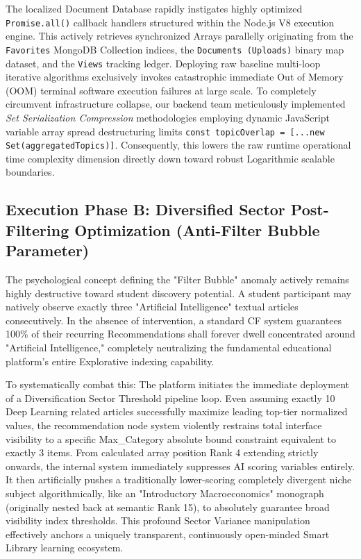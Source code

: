 \documentclass[journal]{IEEEtran}
\begin{document}
The localized Document Database rapidly instigates highly optimized \texttt{Promise.all()} callback handlers structured within the Node.js V8 execution engine. 
This actively retrieves synchronized Arrays parallelly originating from the \texttt{Favorites} MongoDB Collection indices, the \texttt{Documents (Uploads)} binary map dataset, and the \texttt{Views} tracking ledger. 
Deploying raw baseline multi-loop iterative algorithms exclusively invokes catastrophic immediate Out of Memory (OOM) terminal software execution failures at large scale. 
To completely circumvent infrastructure collapse, our backend team meticulously implemented \textit{Set Serialization Compression} methodologies employing dynamic JavaScript variable array spread destructuring limits \texttt{const topicOverlap = [...new Set(aggregatedTopics)]}. 
Consequently, this lowers the raw runtime operational time complexity dimension directly down toward robust Logarithmic scalable boundaries.

\subsection{Execution Phase B: Diversified Sector Post-Filtering Optimization (Anti-Filter Bubble Parameter)}

The psychological concept defining the "Filter Bubble" anomaly actively remains highly destructive toward student discovery potential. 
A student participant may natively observe exactly three "Artificial Intelligence" textual articles consecutively. 
In the absence of intervention, a standard CF system guarantees 100\% of their recurring Recommendations shall forever dwell concentrated around "Artificial Intelligence," completely neutralizing the fundamental educational platform's entire Explorative indexing capability.

To systematically combat this: 
The platform initiates the immediate deployment of a Diversification Sector Threshold pipeline loop. 
Even assuming exactly 10 Deep Learning related articles successfully maximize leading top-tier normalized values, the recommendation node system violently restrains total interface visibility to a specific Max\_Category absolute bound constraint equivalent to exactly 3 items. 
From calculated array position Rank 4 extending strictly onwards, the internal system immediately suppresses AI scoring variables entirely. 
It then artificially pushes a traditionally lower-scoring completely divergent niche subject algorithmically, like an "Introductory Macroeconomics" monograph (originally nested back at semantic Rank 15), to absolutely guarantee broad visibility index thresholds. 
This profound Sector Variance manipulation effectively anchors a uniquely transparent, continuously open-minded Smart Library learning ecosystem.
\end{document}
